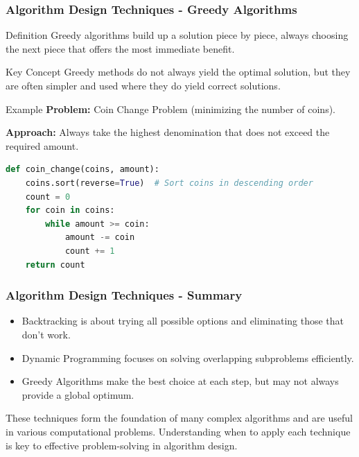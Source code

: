 \documentclass{beamer}
\begin{document}
\begin{frame}[fragile]
    \frametitle{Algorithm Design Techniques - Greedy Algorithms}
    \begin{block}{Definition}
        Greedy algorithms build up a solution piece by piece, always choosing the next piece that offers the most immediate benefit.
    \end{block}

    \begin{block}{Key Concept}
        Greedy methods do not always yield the optimal solution, but they are often simpler and used where they do yield correct solutions.
    \end{block}

    \begin{block}{Example}
        \textbf{Problem:} Coin Change Problem (minimizing the number of coins).
        
        \textbf{Approach:} Always take the highest denomination that does not exceed the required amount.
    \end{block}
    
    \begin{lstlisting}[language=Python]
def coin_change(coins, amount):
    coins.sort(reverse=True)  # Sort coins in descending order
    count = 0
    for coin in coins:
        while amount >= coin:
            amount -= coin
            count += 1
    return count
    \end{lstlisting}
\end{frame}

\begin{frame}[fragile]
    \frametitle{Algorithm Design Techniques - Summary}
    \begin{itemize}
        \item Backtracking is about trying all possible options and eliminating those that don't work.
        \item Dynamic Programming focuses on solving overlapping subproblems efficiently.
        \item Greedy Algorithms make the best choice at each step, but may not always provide a global optimum.
    \end{itemize}
    These techniques form the foundation of many complex algorithms and are useful in various computational problems.
    Understanding when to apply each technique is key to effective problem-solving in algorithm design.
\end{frame}
\end{document}
